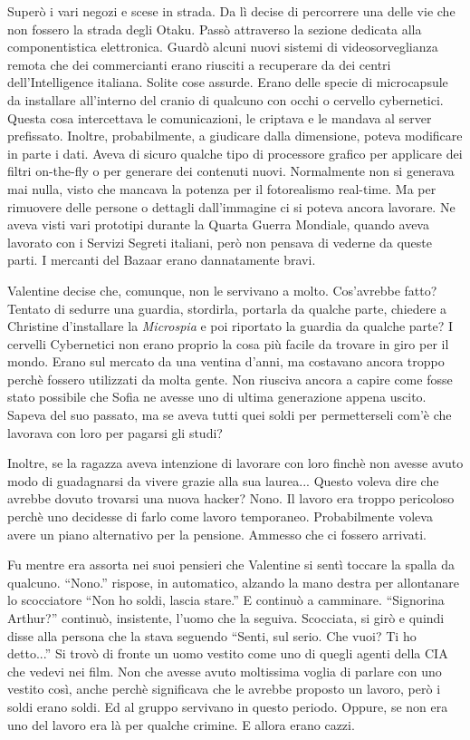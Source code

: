     Superò i vari negozi e scese in strada. Da lì decise di percorrere una delle vie che non fossero la strada degli
    Otaku. Passò attraverso la sezione dedicata alla componentistica elettronica. Guardò alcuni nuovi sistemi di
    videosorveglianza remota che dei commercianti erano riusciti a recuperare da dei centri dell'Intelligence italiana.
    Solite cose assurde. Erano delle specie di microcapsule da installare all'interno del cranio di qualcuno con occhi o
    cervello cybernetici. Questa cosa intercettava le comunicazioni, le criptava e le mandava al server prefissato.
    Inoltre, probabilmente, a giudicare dalla dimensione, poteva modificare in parte i dati. Aveva di sicuro qualche
    tipo di processore grafico per applicare dei filtri on-the-fly o per generare dei contenuti nuovi. Normalmente non
    si generava mai nulla, visto che mancava la potenza per il fotorealismo real-time. Ma per rimuovere delle persone
    o dettagli dall'immagine ci si poteva ancora lavorare. Ne aveva visti vari prototipi durante la Quarta Guerra
    Mondiale, quando aveva lavorato con i Servizi Segreti italiani, però non pensava di vederne da queste parti. I
    mercanti del Bazaar erano dannatamente bravi.

    Valentine decise che, comunque, non le servivano a molto. Cos'avrebbe fatto? Tentato di sedurre una guardia,
    stordirla, portarla da qualche parte, chiedere a Christine d'installare la \emph{Microspia} e poi riportato la
    guardia da qualche parte? I cervelli Cybernetici non erano proprio la cosa più facile da trovare in giro per il
    mondo. Erano sul mercato da una ventina d'anni, ma costavano ancora troppo perchè fossero utilizzati da molta gente.
    Non riusciva ancora a capire come fosse stato possibile che Sofia ne avesse uno di ultima generazione appena uscito.
    Sapeva del suo passato, ma se aveva tutti quei soldi per permetterseli com'è che lavorava con loro per pagarsi gli
    studi?

    Inoltre, se la ragazza aveva intenzione di lavorare con loro finchè non avesse avuto modo di guadagnarsi da vivere
    grazie alla sua laurea... Questo voleva dire che avrebbe dovuto trovarsi una nuova hacker? Nono. Il lavoro era
    troppo pericoloso perchè uno decidesse di farlo come lavoro temporaneo. Probabilmente voleva avere un piano
    alternativo per la pensione. Ammesso che ci fossero arrivati.

    Fu mentre era assorta nei suoi pensieri che Valentine si sentì toccare la spalla da qualcuno. ``Nono.'' rispose, in
    automatico, alzando la mano destra per allontanare lo scocciatore ``Non ho soldi, lascia stare.'' E continuò a
    camminare. ``Signorina Arthur?'' continuò, insistente, l'uomo che la seguiva. Scocciata, si girò e quindi disse alla
    persona che la stava seguendo ``Senti, sul serio. Che vuoi? Ti ho detto...'' Si trovò di fronte un uomo vestito come
    uno di quegli agenti della CIA che vedevi nei film. Non che avesse avuto moltissima voglia di parlare con uno
    vestito così, anche perchè significava che le avrebbe proposto un lavoro, però i soldi erano soldi. Ed al gruppo
    servivano in questo periodo. Oppure, se non era uno del lavoro era là per qualche crimine. E allora erano cazzi.

